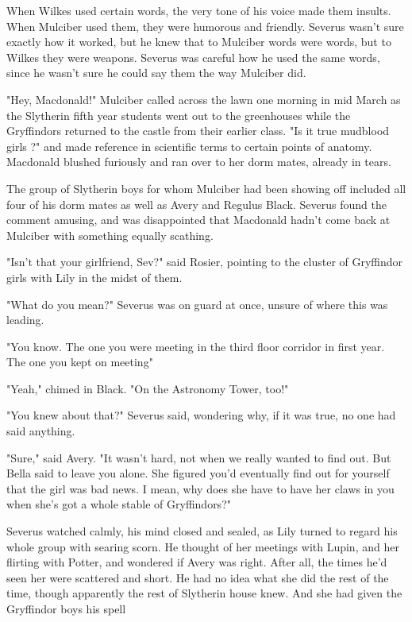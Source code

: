 When Wilkes used certain words, the very tone of his voice made them insults. When Mulciber used them, they were humorous and friendly. Severus wasn't sure exactly how it worked, but he knew that to Mulciber words were words, but to Wilkes they were weapons. Severus was careful how he used the same words, since he wasn't sure he could say them the way Mulciber did.

"Hey, Macdonald!" Mulciber called across the lawn one morning in mid March as the Slytherin fifth year students went out to the greenhouses while the Gryffindors returned to the castle from their earlier class. "Is it true mudblood girls{\el} ?" and made reference in scientific terms to certain points of anatomy. Macdonald blushed furiously and ran over to her dorm mates, already in tears.

The group of Slytherin boys for whom Mulciber had been showing off included all four of his dorm mates as well as Avery and Regulus Black. Severus found the comment amusing, and was disappointed that Macdonald hadn't come back at Mulciber with something equally scathing.

"Isn't that your girlfriend, Sev?" said Rosier, pointing to the cluster of Gryffindor girls with Lily in the midst of them.

"What do you mean?" Severus was on guard at once, unsure of where this was leading.

"You know. The one you were meeting in the third floor corridor in first year. The one you kept on meeting{\el}"

"Yeah," chimed in Black. "On the Astronomy Tower, too!"

"You knew about that?" Severus said, wondering why, if it was true, no one had said anything.

"Sure," said Avery. "It wasn't hard, not when we really wanted to find out. But Bella said to leave you alone. She figured you'd eventually find out for yourself that the girl was bad news. I mean, why does she have to have her claws in you when she's got a whole stable of Gryffindors?"

Severus watched calmly, his mind closed and sealed, as Lily turned to regard his whole group with searing scorn. He thought of her meetings with Lupin, and her flirting with Potter, and wondered if Avery was right. After all, the times he'd seen her were scattered and short. He had no idea what she did the rest of the time, though apparently the rest of Slytherin house knew. And she had given the Gryffindor boys his spell{\el}

